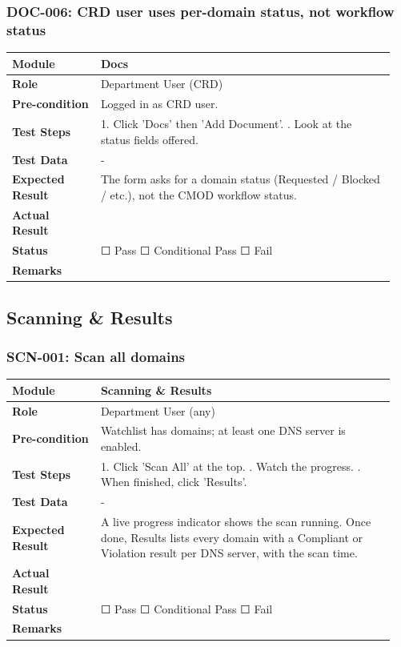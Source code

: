 \documentclass[10pt]{article}
\begin{document}
\subsubsection*{DOC-006: CRD user uses per-domain status, not workflow status}
\begin{longtable}{p{0.22\linewidth}p{0.73\linewidth}}
\hline
\textbf{Module} & Docs \\ \hline
\textbf{Role} & Department User (CRD) \\ \hline
\textbf{Pre-condition} & Logged in as CRD user. \\ \hline
\textbf{Test Steps} & 1. Click 'Docs' then 'Add Document'. \newline 2. Look at the status fields offered. \\ \hline
\textbf{Test Data} & - \\ \hline
\textbf{Expected Result} & The form asks for a domain status (Requested / Blocked / etc.), not the CMOD workflow status. \\ \hline
\textbf{Actual Result} & \newline \newline \\ \hline
\textbf{Status} & ☐ Pass \quad ☐ Conditional Pass \quad ☐ Fail \\ \hline
\textbf{Remarks} & \newline \\ \hline
\end{longtable}
\subsection{Scanning \& Results}
\subsubsection*{SCN-001: Scan all domains}
\begin{longtable}{p{0.22\linewidth}p{0.73\linewidth}}
\hline
\textbf{Module} & Scanning \& Results \\ \hline
\textbf{Role} & Department User (any) \\ \hline
\textbf{Pre-condition} & Watchlist has domains; at least one DNS server is enabled. \\ \hline
\textbf{Test Steps} & 1. Click 'Scan All' at the top. \newline 2. Watch the progress. \newline 3. When finished, click 'Results'. \\ \hline
\textbf{Test Data} & - \\ \hline
\textbf{Expected Result} & A live progress indicator shows the scan running. Once done, Results lists every domain with a Compliant or Violation result per DNS server, with the scan time. \\ \hline
\textbf{Actual Result} & \newline \newline \\ \hline
\textbf{Status} & ☐ Pass \quad ☐ Conditional Pass \quad ☐ Fail \\ \hline
\textbf{Remarks} & \newline \\ \hline
\end{longtable}
\end{document}
